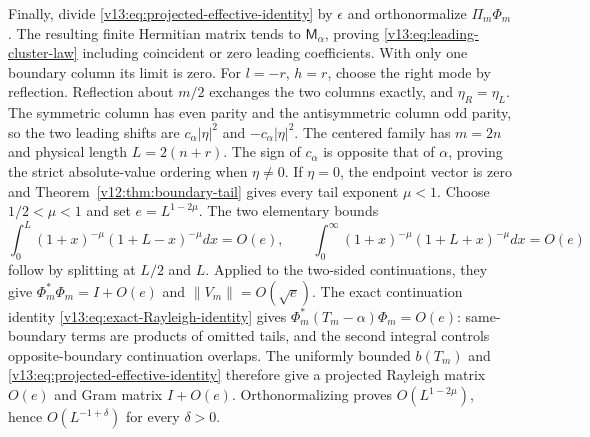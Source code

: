 Finally, divide \eqref{v13:eq:projected-effective-identity} by
$\epsilon$ and orthonormalize $\Pi_m\Phi_m$.  The resulting finite
Hermitian matrix tends to $\mathsf M_\alpha$, proving
\eqref{v13:eq:leading-cluster-law} including coincident or zero
leading coefficients.  With only one boundary column its limit is
zero.  For $l=-r$, $h=r$, choose the right mode by reflection.
Reflection about $m/2$ exchanges the two columns exactly, and
$\eta_R=\eta_L$.  The symmetric column has even parity and the
antisymmetric column odd parity, so the two leading shifts are
$c_\alpha|\eta|^2$ and $-c_\alpha|\eta|^2$.  The centered family
has $m=2n$ and physical length $L=2(n+r)$.
The sign of $c_\alpha$ is opposite that of $\alpha$, proving the
strict absolute-value ordering when $\eta\ne0$.
If $\eta=0$, the endpoint vector is zero and
Theorem~\ref{v12:thm:boundary-tail} gives every tail exponent $\mu<1$.
Choose $1/2<\mu<1$ and set $e=L^{1-2\mu}$. The two elementary bounds
\[
 \int_0^L(1+x)^{-\mu}(1+L-x)^{-\mu}dx=O(e),\qquad
 \int_0^\infty(1+x)^{-\mu}(1+L+x)^{-\mu}dx=O(e)
\]
follow by splitting at $L/2$ and $L$. Applied to the two-sided
continuations, they give $\Phi_m^*\Phi_m=I+O(e)$ and
$\|V_m\|=O(\sqrt e)$. The exact continuation identity
\eqref{v13:eq:exact-Rayleigh-identity} gives
$\Phi_m^*(T_m-\alpha)\Phi_m=O(e)$: same-boundary terms are products
of omitted tails, and the second integral controls opposite-boundary
continuation overlaps. The uniformly bounded $b(T_m)$ and
\eqref{v13:eq:projected-effective-identity} therefore give a projected
Rayleigh matrix $O(e)$ and Gram matrix $I+O(e)$.
Orthonormalizing proves $O(L^{1-2\mu})$, hence
$O(L^{-1+\delta})$ for every $\delta>0$.
